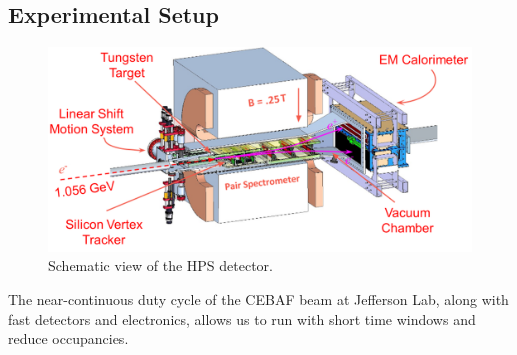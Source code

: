 \documentclass[b1]{sciposter}
\begin{document}
\begin{multicols}{3}
%

        \columnbreak
	\section*{Experimental Setup}
	\begin{figure}
		\begin{center}
                        \includegraphics[width=1.0\textwidth]{hps_detector}
			\caption{Schematic view of the HPS detector.}
		\end{center}
	\end{figure}

	The near-continuous duty cycle of the CEBAF beam at Jefferson Lab, along with fast detectors and electronics, allows us to run with short time windows and reduce occupancies.


\end{multicols}
\end{document}
